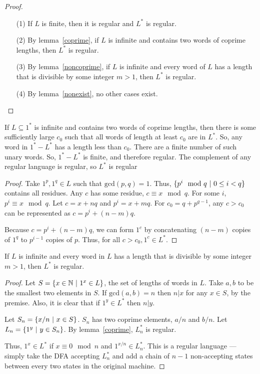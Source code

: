 \documentclass[11pt]{article}
\begin{document}
\begin{proof}\hfill
\begin{itemize}

\item[(1)] If $L$ is finite, then it is regular and $L^*$ is regular.
\item[(2)] By lemma~\ref{coprime}, if $L$ is infinite and contains two words of coprime lengths, then $L^*$ is regular.
\item[(3)] By lemma~\ref{noncoprime}, if $L$ is infinite and every word of $L$ has a length that is divisible by some integer $m>1$, then $L^*$ is regular.
\item[(4)] By lemma~\ref{nonexist}, no other cases exist.

\end{itemize}\end{proof}

\begin{lemma}\label{coprime}
If $L\subseteq 1^*$ is infinite and contains two words of coprime lengths, then there is some sufficiently large $c_0$ such that all words of length at least $c_0$ are in $L^*$. So, any word in $1^* - L^*$ has a length less than $c_0$. There are a finite number of such unary words. So, $1^* - L^*$ is finite, and therefore regular. The complement of any regular language is regular, so $L^*$ is regular
\end{lemma}

\begin{proof}
Take $1^p, 1^q \in L$ such that $\mathrm{gcd}(p,q)=1$. Thus, $\{ p^i \mod{q} \ | \  0 \leq i < q\}$ contains all residues. Any $c$ has some residue, $c \equiv x \mod{q}$. For some $i$, $p^i \equiv x \mod{q}$. Let $c=x+nq$ and $p^i = x+mq$. For $c_0=q+p^{q-1}$, any $c > c_0$ can be represented as $c = p^i + (n-m)q$.

Because $c = p^i + (n-m)q$, we can form $1^c$ by concatenating $(n-m)$ copies of $1^q$ to $p^{i-1}$ copies of $p$. Thus, for all $c > c_0, 1^c \in L^*$.
\end{proof}

\begin{lemma}\label{noncoprime}
If $L$ is infinite and every word in $L$ has a length that is divisible by some integer $m>1$, then $L^*$ is regular.
\end{lemma}

\begin{proof}
Let $S = \{ x \in \mathbb{N} \ | \  1^x \in L \}$, the set of lengths of words in $L$. Take $a,b$ to be the smallest two elements in $S$. If $\mathrm{gcd}(a,b)=n$ then $n | x$ for any $x \in S$, by the premise. Also, it is clear that if $1^y \in L^*$ then $n | y$.

Let $S_n = \{ x/n \ | \  x \in S \}$. $S_n$ has two coprime elements, $a/n$ and $b/n$. Let $L_n = \{ 1^y \ | \  y \in S_n \}$. By lemma~\ref{coprime}, $L_n^*$ is regular.

Thus, $1^x \in L^*$ if $x \equiv 0 \mod{n}$ and $1^{x/n} \in L_n^*$. This is a regular language --- simply take the DFA accepting $L_n^*$ and add a chain of $n-1$ non-accepting states between every two states in the original machine.
\end{proof}
\end{document}
